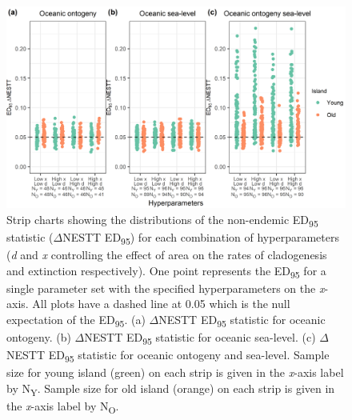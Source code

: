 \begin{figure}
    \centering
    \includegraphics{oceanic_hyperparameters_nonendemic_nltt.png}
    \caption{Strip charts showing the distributions of the non-endemic ED\textsubscript{95} statistic ($\Delta$NESTT ED\textsubscript{95}) for each combination of hyperparameters (\textit{d} and \textit{x} controlling the effect of area on the rates of cladogenesis and extinction respectively). One point represents the ED\textsubscript{95} for a single parameter set with the specified hyperparameters on the \textit{x}-axis. All plots have a dashed line at 0.05 which is the null expectation of the ED\textsubscript{95}. (a) $\Delta$NESTT ED\textsubscript{95} statistic for oceanic ontogeny. (b) $\Delta$NESTT ED\textsubscript{95} statistic for oceanic sea-level. (c) $\Delta$NESTT ED\textsubscript{95} statistic for oceanic ontogeny and sea-level. Sample size for young island (green) on each strip is given in the \textit{x}-axis label by N\textsubscript{Y}. Sample size for old island (orange) on each strip is given in the \textit{x}-axis label by N\textsubscript{O}.}
    \label{fig:oceanic_hyperparamters_nonendemic_nltt}
\end{figure}

